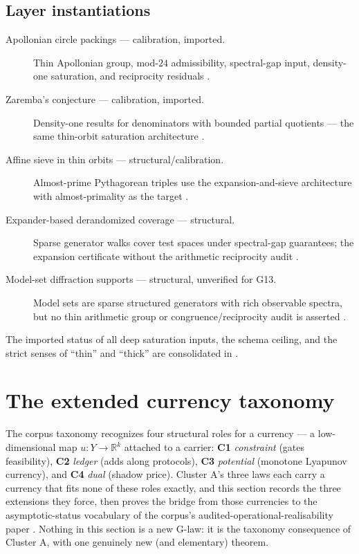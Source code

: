 \documentclass[11pt]{article}
\theoremstyle{definition}
\begin{document}
\subsection*{Layer instantiations}\label{layer-inst:G13}
\begin{description}
  \item[Apollonian circle packings --- calibration, imported.] Thin Apollonian group, mod-$24$
    admissibility, spectral-gap input, density-one saturation, and reciprocity residuals
    \citep{BourgainFuchs2010,BourgainKontorovich2014Apollonian,HaagEtAl2024}.
  \item[Zaremba's conjecture --- calibration, imported.] Density-one results for denominators with
    bounded partial quotients --- the same thin-orbit saturation architecture
    \citep{BourgainKontorovich2014Zaremba}.
  \item[Affine sieve in thin orbits --- structural/calibration.] Almost-prime Pythagorean triples use
    the expansion-and-sieve architecture with almost-primality as the target
    \citep{KontorovichOh2012}.
  \item[Expander-based derandomized coverage --- structural.] Sparse generator walks cover test
    spaces under spectral-gap guarantees; the expansion certificate without the arithmetic
    reciprocity audit \citep{HooryLinialWigderson2006}.
  \item[Model-set diffraction supports --- structural, unverified for G13.] Model sets are sparse
    structured generators with rich observable spectra, but no thin arithmetic group or
    congruence/reciprocity audit is asserted \citep{BaakeGrimm2013}.
\end{description}

The imported status of all deep saturation inputs, the schema ceiling, and the strict senses of
``thin'' and ``thick'' are consolidated in .
\section{The extended currency taxonomy}\label{sec:currency-taxonomy}

The corpus taxonomy recognizes four structural roles for a currency --- a low-dimensional map
$u : Y \to \mathbb{R}^k$ attached to a carrier: \textbf{C1} \emph{constraint} (gates feasibility),
\textbf{C2} \emph{ledger} (adds along protocols), \textbf{C3} \emph{potential} (monotone Lyapunov
currency), and \textbf{C4} \emph{dual} (shadow price). Cluster A's three laws each carry a currency
that fits none of these roles exactly, and this section records the three extensions they force,
then proves the bridge from those currencies to the asymptotic-status vocabulary of the corpus's
audited-operational-realisability paper \citep{Tsiokos2026AOR}. Nothing in this section is a new
G-law: it is the taxonomy consequence of Cluster A, with one genuinely new (and elementary) theorem.
\end{document}
